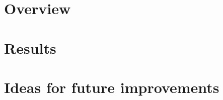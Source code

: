 \documentclass[11pt]{article}
\begin{document}
    \section{Overview}\label{sec:overview}


    \section{Results}\label{sec:results}


    \section{Ideas for future improvements}\label{sec:ideas}
\end{document}
